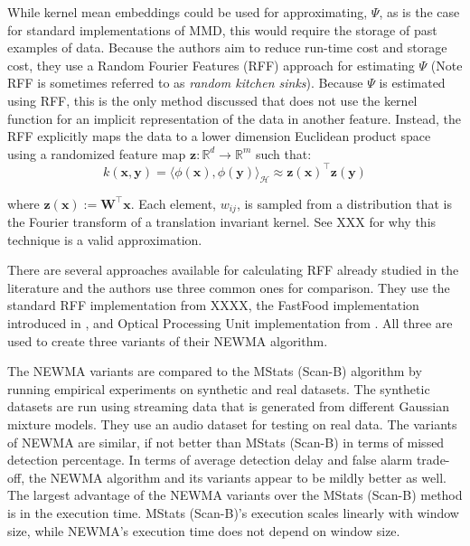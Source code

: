 While kernel mean embeddings could be used for approximating, $\Psi$, as is the case for standard implementations of MMD, this would require the storage of past examples of data. Because the authors aim to reduce run-time cost and storage cost, they use a Random Fourier Features (RFF) approach for estimating $\Psi$ (Note RFF is sometimes referred to as \textit{random kitchen sinks}). Because $\Psi$  is estimated using RFF, this is the only method discussed that does not use the kernel function for an implicit representation of the data in another feature. Instead, the RFF explicitly maps the data to a lower dimension Euclidean product space using a randomized feature map $\mathbf{z}: \mathbb{R}^d \rightarrow \mathbb{R}^m$ such that:
\begin{equation}
k(\mathbf{x}, \mathbf{y})=\langle\phi(\mathbf{x}), \phi(\mathbf{y})\rangle_{\mathcal{H}} \approx \mathbf{z}(\mathbf{x})^{\top} \mathbf{z}(\mathbf{y})
\end{equation}

where $\mathbf{z}(\mathbf{x}):=\mathbf{W}^{\top} \mathbf{x}$. Each element, $w_{ij}$, is sampled from a distribution that is the Fourier transform of a translation invariant kernel. See XXX for why this technique is a valid approximation.

There are several approaches available for calculating RFF already studied in the literature and the authors use three common ones for comparison. They use the standard RFF implementation from XXXX, the FastFood implementation introduced in \cite{le2014fastfood}, and Optical Processing Unit implementation from \cite{saade2016random}. All three are used to create three variants of their NEWMA algorithm.

The NEWMA variants are compared to the MStats (Scan-B) algorithm by running empirical experiments on synthetic and real datasets. The synthetic datasets are run using streaming data that is generated from different Gaussian mixture models. They use an audio dataset for testing on real data. The variants of NEWMA are similar, if not better than MStats (Scan-B) in terms of missed detection percentage. In terms of average detection delay and false alarm trade-off, the NEWMA algorithm and its variants appear to be mildly better as well. The largest advantage of the NEWMA variants over the MStats (Scan-B) method is in the execution time. MStats (Scan-B)'s execution scales linearly with window size, while NEWMA's execution time does not depend on window size.

